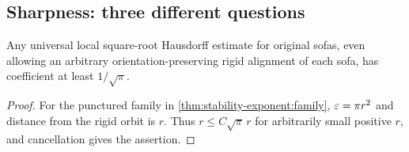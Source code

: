 \subsection{Sharpness: three different questions}
\label{sec:quant-sharpness}

\begin{corollary}
\label{cor:quant-sofa-lower}
Any universal local square-root Hausdorff estimate for original sofas,
even allowing an arbitrary orientation-preserving rigid alignment of each
sofa, has coefficient at least $1/\sqrt\pi$.
\end{corollary}
\begin{proof}
For the punctured family in \cref{thm:stability-exponent:family},
$\varepsilon=\pi r^2$ and distance from the rigid orbit is $r$. Thus
$r\le C\sqrt\pi\,r$ for arbitrarily small positive $r$, and cancellation
gives the assertion.
\end{proof}


